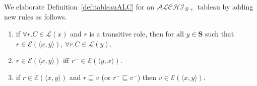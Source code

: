 \documentclass{article}
\newtheorem{mydef}{Definition}
\begin{document}
We elaborate Definition~\ref{def:tableauALC} for an $\mathcal{ALCHI_{R+}}$ tableau by adding new rules as follows.
% 
\begin{enumerate}
\item if $\forall r.C\in \mathcal{L}(x)$ and $r$ is a transitive role, then for all $y \in \mathbf{S}$ such that $r \in \mathcal{E}(\langle x,y\rangle)$, 
$\forall r.C\in\mathcal{L}(y)$.
\item $r \in \mathcal{E}(\langle x,y\rangle)$ iff  $ r^-\in \mathcal{E}(\langle y,x\rangle)$.
\item if $ r\in \mathcal{E}(\langle x,y\rangle)$ and $r\sqsubseteq v$ (or $r^-\sqsubseteq v^-$) then  $v \in \mathcal{E}(\langle x,y\rangle)$.
\end{enumerate}
\end{document}
